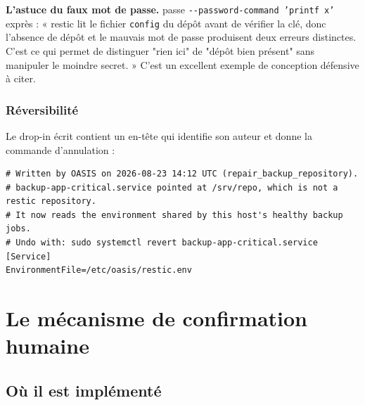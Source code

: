 \begin{keybox}
\textbf{L'astuce du faux mot de passe.}  passe
\texttt{-{}-password-command 'printf x'} exprès : « restic lit le fichier
\texttt{config} du dépôt avant de vérifier la clé, donc l'absence de dépôt et le
mauvais mot de passe produisent deux erreurs distinctes. C'est ce qui permet de
distinguer "rien ici" de "dépôt bien présent" sans manipuler le moindre
secret. » C'est un excellent exemple de conception défensive à citer.
\end{keybox}

\subsubsection*{Réversibilité}
Le drop-in écrit contient un en-tête qui identifie son auteur et donne la
commande d'annulation :

\begin{lstlisting}[caption={Contenu du fichier /etc/systemd/system/<service>.d/50-oasis-repair.conf}]
# Written by OASIS on 2026-08-23 14:12 UTC (repair_backup_repository).
# backup-app-critical.service pointed at /srv/repo, which is not a restic repository.
# It now reads the environment shared by this host's healthy backup jobs.
# Undo with: sudo systemctl revert backup-app-critical.service
[Service]
EnvironmentFile=/etc/oasis/restic.env
\end{lstlisting}

\section{Le mécanisme de confirmation humaine}

\subsection{Où il est implémenté}

